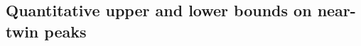 \documentclass[oneside,final,11pt]{amsart}
\newtheorem{conjec}[thm]{Conjecture}
\newtheorem{ques}[thm]{Question}
\theoremstyle{definition}
\newcommand{\fh}{\mathfrak{h}}
\newcommand{\CT}{\mathcal{T}}
\newcommand{\1}[1]{\mathbf{1}_{#1}}
\newcommand{\eps}{\varepsilon}
\newcommand{\red}[1]{{\color{red}#1}}
\renewcommand{\P}{\mathbb P}
\numberwithin{equation}{section}
\begin{document}







\subsection{Quantitative upper and lower bounds on near-twin peaks}
\end{document}
